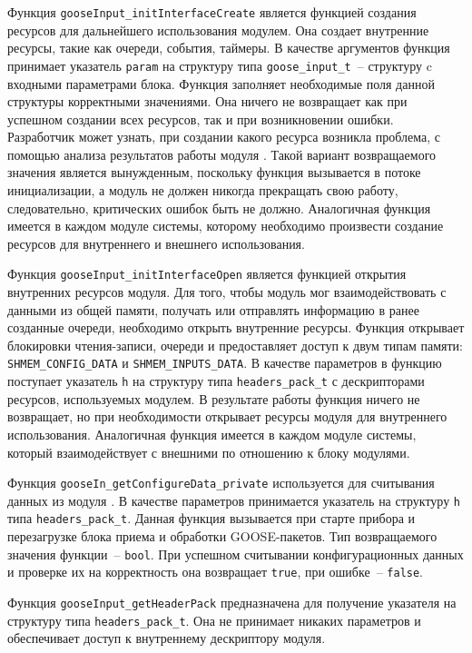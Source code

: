 Функция \lstinline{gooseInput_initInterfaceCreate} является функцией создания
ресурсов для дальнейшего использования модулем.
Она создает внутренние ресурсы, такие как очереди, события, таймеры.
В качестве аргументов функция принимает указатель \lstinline{param}
на структуру типа \lstinline{goose_input_t}~-- структуру
c входными параметрами блока. Функция заполняет необходимые поля
данной структуры корректными значениями. Она ничего не возвращает
как при успешном создании всех ресурсов, так и при возникновении ошибки.
Разработчик может узнать, при создании какого ресурса возникла проблема,
с помощью анализа результатов работы модуля \moduleLog.
Такой вариант возвращаемого
значения является вынужденным, поскольку функция вызывается в потоке инициализации,
а модуль не должен никогда прекращать свою работу, следовательно, критических ошибок
быть не должно. Аналогичная функция имеется в каждом модуле системы,
которому необходимо произвести создание ресурсов для внутреннего и внешнего
использования.

Функция \lstinline{gooseInput_initInterfaceOpen} является функцией открытия
внутренних ресурсов модуля. Для того, чтобы модуль мог взаимодействовать с
данными из общей памяти, получать или отправлять информацию в ранее созданные
очереди, необходимо открыть внутренние ресурсы. Функция открывает блокировки
чтения-записи, очереди и предоставляет доступ к двум типам памяти:
\lstinline{SHMEM_CONFIG_DATA} и \lstinline{SHMEM_INPUTS_DATA}.
В качестве параметров в функцию поступает указатель \lstinline{h} на структуру
типа \lstinline{headers_pack_t} с дескрипторами ресурсов, используемых модулем.
В результате работы функция ничего не возвращает, но при необходимости открывает
ресурсы модуля для внутреннего использования. Аналогичная функция имеется
в каждом модуле системы, который взаимодействует с внешними по отношению к блоку
модулями.

Функция \lstinline{gooseIn_getConfigureData_private} используется для считывания данных из модуля \moduleCfg. В качестве параметров принимается указатель на структуру \lstinline{h} типа \lstinline{headers_pack_t}. Данная функция вызывается при старте прибора и перезагрузке блока приема и обработки GOOSE-пакетов. Тип возвращаемого
значения функции~-- \lstinline{bool}. При успешном считывании конфигурационных
данных и проверке их на корректность
она возвращает \lstinline{true}, при ошибке~-- \lstinline{false}.

Функция \lstinline{gooseInput_getHeaderPack} предназначена для получение указателя
на структуру типа \lstinline{headers_pack_t}. Она не принимает никаких параметров
и обеспечивает доступ к внутреннему дескриптору модуля.

